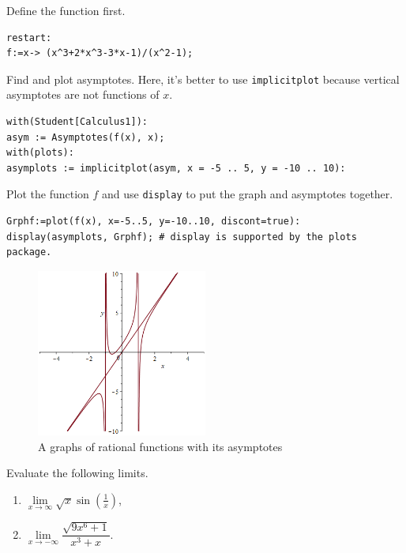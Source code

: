 \documentclass[
  en,11pt,simple]{elegantbook}
\newcommand{\size}[2]{{\fontsize{#1}{0}\selectfont#2}}
\renewenvironment{exercise}[1][]{
    \refstepcounter{exer}
    \par\noindent
    \makebox[-3pt][r]{\color{red!90}\size{12}{\HandPencilLeft}}
	\textbf{\color{main}{\exercisename} \theexer #1}
    \rmfamily
}{\par\ignorespacesafterend}
\begin{document}
\begin{solution}
{}
Define the function first.

\begin{verbatim}
restart:
f:=x-> (x^3+2*x^3-3*x-1)/(x^2-1);
\end{verbatim}

Find and plot asymptotes. Here, it's better to use \texttt{implicitplot} because vertical asymptotes are not functions of \(x\).

\begin{verbatim}
with(Student[Calculus1]):
asym := Asymptotes(f(x), x);
with(plots):
asymplots := implicitplot(asym, x = -5 .. 5, y = -10 .. 10):
\end{verbatim}

Plot the function \(f\) and use \texttt{display} to put the graph and asymptotes together.

\begin{verbatim}
Grphf:=plot(f(x), x=-5..5, y=-10..10, discont=true):
display(asymplots, Grphf); # display is supported by the plots package.
\end{verbatim}

\begin{figure}
\centering
\includegraphics[width=0.5\textwidth,height=\textheight]{figs/asymptotes.png}
\caption{A graphs of rational functions with its asymptotes}
\end{figure}
\end{solution}

\begin{exercise}

Evaluate the following limits.

\begin{enumerate}
\def\labelenumi{\arabic{enumi}.}

\item
  \(\lim\limits_{x\to \infty}\sqrt{x}\sin(\frac{1}{x})\),
\item
  \(\lim\limits_{x\to-\infty}\dfrac{\sqrt{9x^6+1}}{x^3+x}\).
\end{enumerate}
\end{exercise}
\end{document}
